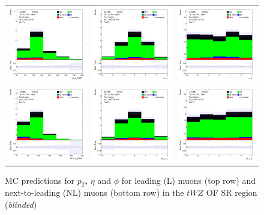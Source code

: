 \begin{figure}[htbp]
    \centering
  \begin{tabular}{ccc}


    \includegraphics[width=.2\textwidth]{figures/PreFitPlots/lep4_tWZ_4T_OF_L_mu_pt} &
    \includegraphics[width=.2\textwidth]{figures/PreFitPlots/lep4_tWZ_4T_OF_L_mu_eta} &
    \includegraphics[width=.2\textwidth]{figures/PreFitPlots/lep4_tWZ_4T_OF_L_mu_phi} \\
    \includegraphics[width=.2\textwidth]{figures/PreFitPlots/lep4_tWZ_4T_OF_NL_mu_pt} &
    \includegraphics[width=.2\textwidth]{figures/PreFitPlots/lep4_tWZ_4T_OF_NL_mu_eta} &
    \includegraphics[width=.2\textwidth]{figures/PreFitPlots/lep4_tWZ_4T_OF_NL_mu_phi} \\

  \end{tabular}
    \caption{MC predictions for $p_{T}$, $\eta$ and $\phi$ for leading (L) muons (top row) and next-to-leading (NL) muons (bottom row) in the $tWZ$ OF SR region (\textit{blinded})}
\end{figure}
\clearpage

